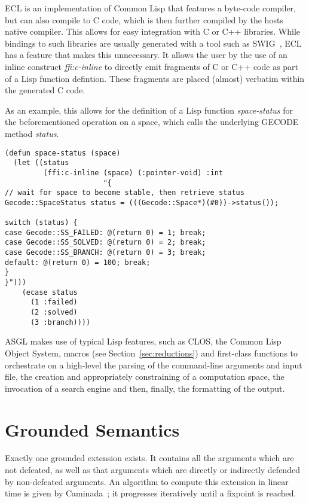 \documentclass[runningheads,a4paper]{llncs}
\begin{document}
ECL is an implementation of Common Lisp that features a
byte-code compiler, but can also compile to C code, which is then
further compiled by the hosts native compiler. This allows for easy
integration with C or C++ libraries. While bindings to such libraries
are usually generated with a tool such as SWIG~\cite{swig}, ECL has a
feature that makes this unnecessary. It allows the user by the use of
an inline construct \textit{ffi:c-inline} to directly emit fragments of C
or C++ code as part of a Lisp function defintion. These fragments are
placed (almost) verbatim within the generated C code.

As an example, this allows for the definition of a Lisp function
\textit{space-status} for the beforementioned operation on a space,
which calls the underlying GECODE method \textit{status}.

\begin{scriptsize}
\begin{verbatim}
(defun space-status (space)
  (let ((status
         (ffi:c-inline (space) (:pointer-void) :int
                       "{
// wait for space to become stable, then retrieve status
Gecode::SpaceStatus status = (((Gecode::Space*)(#0))->status());

switch (status) {
case Gecode::SS_FAILED: @(return 0) = 1; break;
case Gecode::SS_SOLVED: @(return 0) = 2; break;
case Gecode::SS_BRANCH: @(return 0) = 3; break;
default: @(return 0) = 100; break;
}
}")))
    (ecase status
      (1 :failed)
      (2 :solved)
      (3 :branch))))
\end{verbatim}
\end{scriptsize}

ASGL makes use of typical Lisp features, such as CLOS, the Common Lisp
Object System, macros (see Section~\ref{sec:reductions}) and
first-class functions to orchestrate on a high-level the parsing of
the command-line arguments and input file, the creation and
appropriately constraining of a computation space, the invocation of a
search engine and then, finally, the formatting of the output.

\section{Grounded Semantics}\label{sec:grounded}

Exactly one grounded extension exists. It contains all the arguments
which are not defeated, as well as that arguments which are directly
or indirectly defended by non-defeated arguments. An algorithm to
compute this extension in linear time is given by
Caminada~\cite{Modgil2009}; it progresses iteratively until a fixpoint
is reached.
\end{document}
